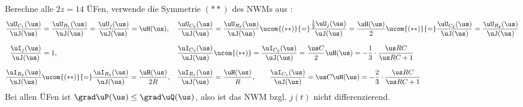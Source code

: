 \documentclass[ngerman,10pt,a4paper]{article}%
\begin{document}
\clearpage{}
Berechne alle $2z=14$ ÜFen, verwende die Symmetrie $(**)$ des NWMs aus :
\begin{align*}%
	\frac{\uU_{C_1}(\us)}{\uJ(\us)}&=\frac{\uU_{R_1}(\us)}{\uJ(\us)}=\frac{\uU_{j}(\us)}{\uJ(\us)}=\uH(\us),&\frac{\uU_{C_3}(\us)}{\uJ(\us)}&=\frac{\uU_{R_3}(\us)}{\uJ(\us)}\ucom{(**)}{=}\frac{\frac{1}{2}\uU_{j}(\us)}{\uJ(\us)}=\frac{\uH(\us)}{2}\ucom{(**)}{=}\frac{\uU_{C_2}(\us)}{\uJ(\us)}=\frac{\uU_{R_2}(\us)}{\uJ(\us)}\\[2.5mm]%
%
	\frac{\uI_j(\us)}{\uJ(\us)}&=1,&\frac{\uI_{C_3}(\us)}{\uJ(\us)}&\ucom{(**)}=\frac{\uI_{C_2}(\us)}{\uJ(\us)}=\frac{\us C}{2}\uH(\us)=-\frac{1}{3}\cdot\frac{\us RC}{\us RC+1}\\[2.5mm]%
%
	\frac{\uI_{R_2}(\us)}{\uJ(\us)}&\ucom{(**)}{=}\frac{\uI_{R_3}(\us)}{\uJ(\us)}=\frac{\uH(\us)}{2R},&\frac{\uI_{R_1}(\us)}{\uJ(\us)}&=\frac{\uH(\us)}{R},\qquad \frac{\uI_{C_1}(\us)}{\uJ(\us)}=\us C\uH(\us)=-\frac{2}{3}\cdot\frac{\us RC}{\us RC+1}%
\end{align*}%
%
Bei allen ÜFen ist $\grad\uP(\us)\leq\grad\uQ(\us)$, also ist das NWM bzgl. $j(t)$ nicht differenzierend.
\end{document}
